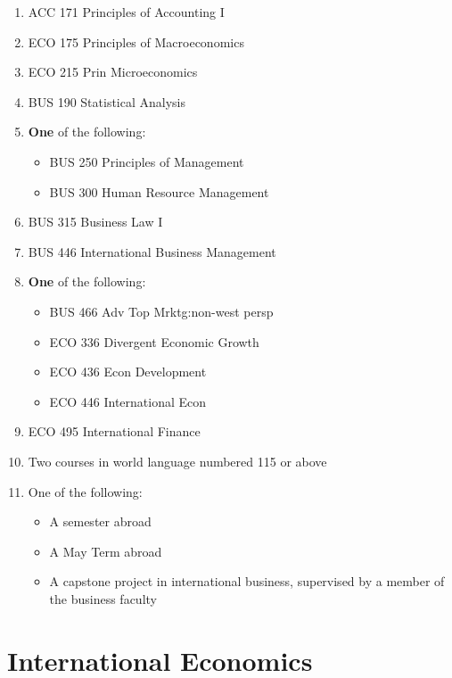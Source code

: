 \documentclass[
  letterpaper,
]{scrbook}
\providecommand{\tightlist}{%
  \setlength{\itemsep}{0pt}\setlength{\parskip}{0pt}}
\begin{document}
\begin{enumerate}
\def\labelenumi{\arabic{enumi}.}
\tightlist
\item
  ACC 171 Principles of Accounting I
\item
  ECO 175 Principles of Macroeconomics
\item
  ECO 215 Prin Microeconomics
\item
  BUS 190 Statistical Analysis
\item
  \textbf{One} of the following:

  \begin{itemize}
  \tightlist
  \item
    BUS 250 Principles of Management
  \item
    BUS 300 Human Resource Management
  \end{itemize}
\item
  BUS 315 Business Law I
\item
  BUS 446 International Business Management
\item
  \textbf{One} of the following:

  \begin{itemize}
  \tightlist
  \item
    BUS 466 Adv Top Mrktg:non-west persp
  \item
    ECO 336 Divergent Economic Growth
  \item
    ECO 436 Econ Development
  \item
    ECO 446 International Econ
  \end{itemize}
\item
  ECO 495 International Finance
\item
  Two courses in world language numbered 115 or above
\item
  One of the following:

  \begin{itemize}
  \tightlist
  \item
    A semester abroad
  \item
    A May Term abroad
  \item
    A capstone project in international business, supervised by a member
    of the business faculty
  \end{itemize}
\end{enumerate}

\section{International Economics}\label{sec-international-economics}
\end{document}
